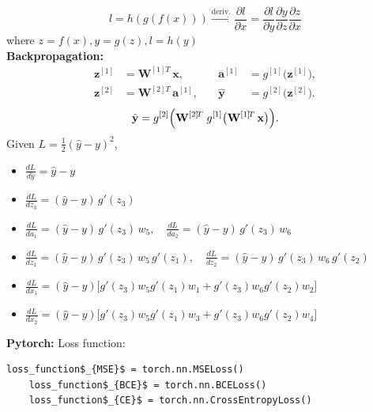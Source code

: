 \documentclass[8pt,twocolumn]{article}
\begin{document}
\[l = h(g(f(x))) \xrightarrow{\text{deriv.}} \frac{\partial l}{\partial x} 
= \frac{\partial l}{\partial y}\frac{\partial y}{\partial z}\frac{\partial z}{\partial x}\]
where $z = f(x), y = g(z), l = h(y)$\\
\textbf{Backpropagation:}
\[
\begin{aligned}
\mathbf{z}^{[1]} &= \mathbf{W}^{[1]\!T}\,\mathbf{x}, 
&\quad
\mathbf{a}^{[1]} &= g^{[1]}\bigl(\mathbf{z}^{[1]}\bigr),\\
\mathbf{z}^{[2]} &= \mathbf{W}^{[2]\!T}\,\mathbf{a}^{[1]}, 
&\quad
\hat{\mathbf{y}} &= g^{[2]}\bigl(\mathbf{z}^{[2]}\bigr).
\end{aligned}
\]
\[
\hat{\mathbf{y}}
= g^{[2]}\Bigl(\mathbf{W}^{[2]\!T}\;g^{[1]}\bigl(\mathbf{W}^{[1]\!T}\,\mathbf{x}\bigr)\Bigr).
\]
Given $L = \frac{1}{2}(\hat{y} - y)^2$, \vspace{-0.6em}
\begin{itemize}
    \setlength{\itemsep}{0pt}
    \setlength{\parskip}{0pt}
    \item $\frac{dL}{d\hat y} = \hat y - y$
    \item $\frac{dL}{dz_3} = (\hat y - y)\,g'(z_3)$
    \item $\frac{dL}{da_1} = (\hat y - y)\,g'(z_3)\,w_5,\quad
                    \frac{dL}{da_2} = (\hat y - y)\,g'(z_3)\,w_6$
    \item $\frac{dL}{dz_1} = (\hat y - y)\,g'(z_3)\,w_5\,g'(z_1),\quad
                    \frac{dL}{dz_2} = (\hat y - y)\,g'(z_3)\,w_6\,g'(z_2)$
    \item $\frac{dL}{dx_1} = (\hat y - y)\bigl[g'(z_3)w_5g'(z_1)w_1 + g'(z_3)w_6g'(z_2)w_2\bigr]$
    \item $\frac{dL}{dx_2} = (\hat y - y)\bigl[g'(z_3)w_5g'(z_1)w_3 + g'(z_3)w_6g'(z_2)w_4\bigr]$
  \end{itemize}
\textbf{Pytorch:}\vspace{-0.6em}
Loss function:
\begin{lstlisting}[mathescape = true]
    loss_function$_{MSE}$ = torch.nn.MSELoss() 
    loss_function$_{BCE}$ = torch.nn.BCELoss() 
    loss_function$_{CE}$ = torch.nn.CrossEntropyLoss()
\end{lstlisting}\vspace{-0.6em}
\end{document}
